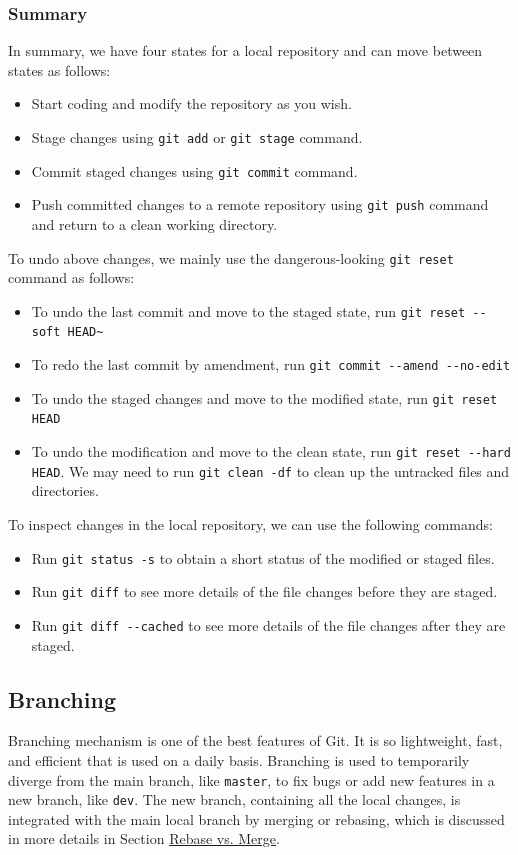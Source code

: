 \documentclass[11pt]{article}
\begin{document}
\subsubsection{Summary}
\label{sec:orgheadline9}
In summary, we have four states for a local repository and can move between states as follows:
\begin{itemize}
\item Start coding and modify the repository as you wish.
\item Stage changes using \texttt{git add} or \texttt{git stage} command.
\item Commit staged changes using \texttt{git commit} command.
\item Push committed changes to a remote repository using \texttt{git push} command and return to a clean working directory.
\end{itemize}

To undo above changes, we mainly use the dangerous-looking \texttt{git reset} command as follows:
\begin{itemize}
\item To undo the last commit and move to the staged state, run \texttt{git reset -{}-soft HEAD\textasciitilde{}}
\item To redo the last commit by amendment, run \texttt{git commit -{}-amend -{}-no-edit}
\item To undo the staged changes and move to the modified state, run \texttt{git reset HEAD}
\item To undo the modification and move to the clean state, run \texttt{git reset -{}-hard HEAD}. We may need to run \texttt{git clean -df} to clean up the untracked files and directories.
\end{itemize}

To inspect changes in the local repository, we can use the following commands:
\begin{itemize}
\item Run \texttt{git status -s} to obtain a short status of the modified or staged files.
\item Run \texttt{git diff} to see more details of the file changes before they are staged.
\item Run \texttt{git diff -{}-cached} to see more details of the file changes after they are staged.
\end{itemize}

\subsection{Branching}
\label{sec:orgheadline11}
Branching mechanism is one of the best features of Git. It is so lightweight, fast, and efficient that is used on a daily basis. Branching is used to temporarily diverge from the main branch, like \texttt{master}, to fix bugs or add new features in a new branch, like \texttt{dev}. The new branch, containing all the local changes, is integrated with the main local branch by merging or rebasing, which is discussed in more details in Section \hyperref[orgtarget6]{Rebase vs. Merge}.
\end{document}
